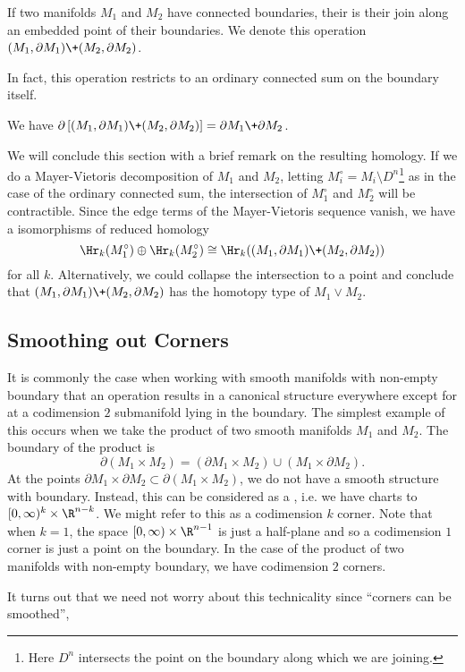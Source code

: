 \begin{definition}
	If two manifolds $M_1$ and $M_2$ have connected boundaries, their  is their join along an embedded point of their boundaries. We denote this operation $(M_1,\partial M_1)\+ (M_2,\partial M_2)$.
\end{definition}

In fact, this operation restricts to an ordinary connected sum on the boundary itself.

\begin{proposition} We have $\partial\left[(M_1,\partial M_1)\+ (M_2,\partial M_2)\right] = \partial M_1\+\partial M_2$.
\end{proposition}

We will conclude this section with a brief remark on the resulting homology. If we do a Mayer-Vietoris decomposition of $M_1$ and $M_2$, letting $M_i^\circ=M_i\setminus D^n$\footnote{Here $D^n$ intersects the point on the boundary along which we are joining.} as in the case of the ordinary connected sum, the intersection of $M_1^\circ$ and $M_2^\circ$ will be contractible. Since the edge terms of the Mayer-Vietoris sequence vanish, we have a isomorphisms of reduced homology
\[
		\Hr_k(M_1^\circ)\oplus \Hr_k(M_2^\circ) \cong \Hr_k((M_1,\partial M_1)\+ (M_2,\partial M_2))
\]
for all $k$. Alternatively, we could collapse the intersection to a point and conclude that $(M_1,\partial M_1)\+(M_2,\partial M_2)$ has the homotopy type of $M_1\vee M_2$.

\subsection{Smoothing out Corners}\label{sec:smoothing-corners}

It is commonly the case when working with smooth manifolds with non-empty boundary that an operation results in a canonical structure everywhere except for at a codimension $2$ submanifold lying in the boundary. The simplest example of this occurs when we take the product of two smooth manifolds $M_1$ and $M_2$. The boundary of the product is
\[
		\partial(M_1\times M_2) = (\partial M_1 \times M_2) \cup (M_1\times \partial M_2).
\]
At the points $\partial M_1\times \partial M_2\subset \partial (M_1\times M_2)$, we do not have a smooth structure with boundary. Instead, this can be considered as a , i.e. we have charts to $[0,\infty)^k\times \R^{n-k}$. We might refer to this as a codimension $k$ corner. Note that when $k=1$, the space $[0,\infty)\times \R^{n-1}$ is just a half-plane and so a codimension $1$ corner is just a point on the boundary. In the case of the product of two manifolds with non-empty boundary, we have codimension $2$ corners. 

It turns out that we need not worry about this technicality since ``corners can be smoothed'', 

\cite{milnor1958manifolds}
